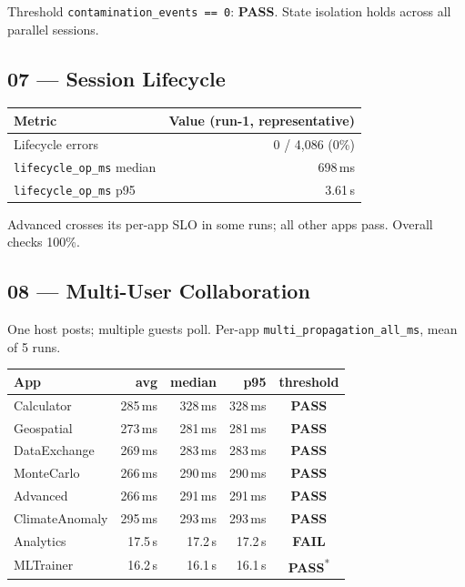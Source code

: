 \documentclass[11pt,a4paper]{article}
\newcommand{\pass}{\textcolor{pass}{\textbf{PASS}}}
\newcommand{\fail}{\textcolor{fail}{\textbf{FAIL}}}
\begin{document}
\medskip\noindent Threshold \texttt{contamination\_events == 0}: \pass.
State isolation holds across all parallel sessions.

\subsection{07 — Session Lifecycle}

\begin{tabular}{@{}lr@{}}
\toprule
\textbf{Metric} & \textbf{Value (run-1, representative)} \\
\midrule
Lifecycle errors & 0 / 4{,}086 (0\%) \\
\texttt{lifecycle\_op\_ms} median & 698\,ms \\
\texttt{lifecycle\_op\_ms} p95    & 3.61\,s \\
\bottomrule
\end{tabular}

\medskip\noindent Advanced crosses its per-app SLO in some runs; all other
apps pass. Overall checks 100\%.

\subsection{08 — Multi-User Collaboration}

One host posts; multiple guests poll. Per-app
\texttt{multi\_propagation\_all\_ms}, mean of 5 runs.

\begin{tabular}{@{}lrrrc@{}}
\toprule
\textbf{App} & \textbf{avg} & \textbf{median} & \textbf{p95} & \textbf{threshold} \\
\midrule
Calculator      & 285\,ms & 328\,ms & 328\,ms & \pass \\
Geospatial      & 273\,ms & 281\,ms & 281\,ms & \pass \\
DataExchange    & 269\,ms & 283\,ms & 283\,ms & \pass \\
MonteCarlo      & 266\,ms & 290\,ms & 290\,ms & \pass \\
Advanced        & 266\,ms & 291\,ms & 291\,ms & \pass \\
ClimateAnomaly  & 295\,ms & 293\,ms & 293\,ms & \pass \\
Analytics       & 17.5\,s & 17.2\,s & 17.2\,s & \fail \\
MLTrainer       & 16.2\,s & 16.1\,s & 16.1\,s & \pass\textsuperscript{*} \\
\bottomrule
\end{tabular}
\end{document}
